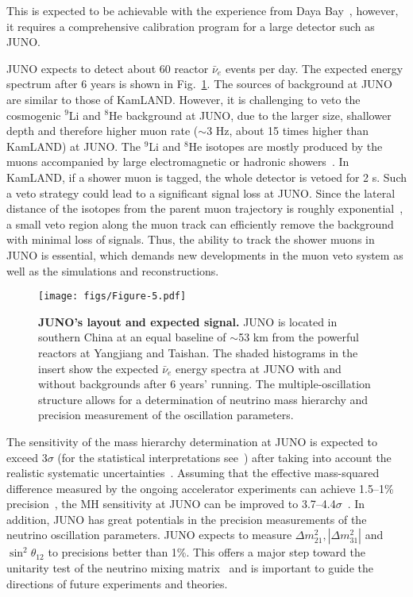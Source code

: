 \documentclass[aps,twocolumn,preprintnumbers,amsmath,superscriptaddress,amssymb,floats,nofootinbib]{revtex4-1}
\begin{document}
This is expected to be achievable with the experience from Daya Bay~\cite{Zhang-Neutrino14}, however, it requires a comprehensive calibration program for a large detector such as JUNO.

JUNO expects to detect about 60 reactor $\bar\nu_e$ events per day. The expected energy spectrum after 6 years is shown in Fig.~\ref{fig:juno}.
The sources of background at JUNO are similar to those of KamLAND. 
However, it is challenging to veto the cosmogenic $^9$Li and $^8$He background at JUNO, due to the larger size, shallower depth and therefore higher muon rate ($\sim$3 Hz, about 15 times higher than KamLAND) at JUNO. 
The $^9$Li and $^8$He isotopes are mostly produced by the muons accompanied by large electromagnetic or hadronic showers~\cite{KamLAND-spall}. In KamLAND, if a shower muon is tagged, the whole detector is vetoed for 2 s. Such a veto strategy could lead to a significant signal loss at JUNO. 
Since the lateral distance of the isotopes from the parent muon trajectory is roughly exponential~\cite{KamLAND-spall}, a small veto region along the muon track can efficiently remove the background with minimal loss of signals. Thus, the ability to track the shower muons in JUNO is essential, which demands new developments in the muon veto system as well as the simulations and reconstructions.

\begin{figure}[tb] \label{fig:juno}
  \centering
  \texttt{[image: figs/Figure-5.pdf]}
  \caption{{\bf JUNO's layout and expected signal.} JUNO is located in southern China at an equal baseline of $\sim$53 km from the powerful reactors at Yangjiang and Taishan. The shaded histograms in the insert show the expected $\bar\nu_e$ energy spectra at JUNO with and without backgrounds after 6 years' running. The multiple-oscillation structure allows for a determination of neutrino mass hierarchy and precision measurement of the oscillation parameters.}
\end{figure}

The sensitivity of the mass hierarchy determination at JUNO is expected to exceed 3$\sigma$ (for the statistical interpretations see~\cite{Qian-Stat,Blennow}) after taking into account the realistic systematic uncertainties~\cite{Li-PRD13,MBRwitepaper}. 
Assuming that the effective mass-squared difference measured by the ongoing accelerator experiments can achieve 1.5--1\% precision~\cite{Agarwalla}, the MH sensitivity at JUNO can be improved to 3.7--4.4$\sigma$~\cite{Li-PRD13}. 
In addition, JUNO has great potentials in the precision measurements of the neutrino oscillation parameters. JUNO expects to measure $\Delta m^2_{21}, |\Delta m^2_{31}|$ and $\sin^2 \theta_{12}$ to precisions better than 1\%. This offers a major step toward the unitarity test of the neutrino mixing matrix~\cite{unitarity13} and is important to guide the directions of future experiments and theories. 
\end{document}
